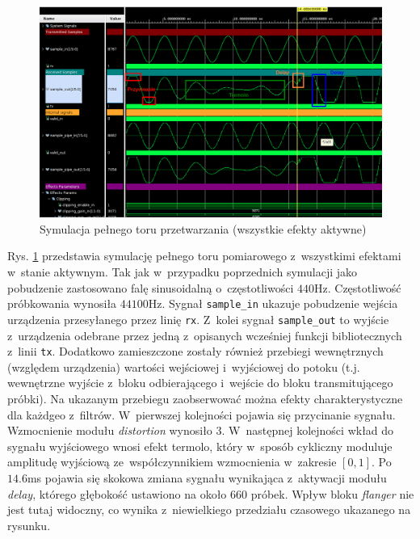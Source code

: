 \vspace{0.75cm}
\begin{figure}[ht]
    \centering
    \includegraphics[width=\textwidth]{img/sim/top_all_effects_sim.png}
    \captionsetup{format=plain,justification=centering}
    \caption{Symulacja pełnego toru przetwarzania (wszystkie efekty aktywne)}
    \label{top-all-sim}
\end{figure}
\vspace{0.75cm}

Rys. \ref{top-all-sim} przedstawia symulację pełnego toru pomiarowego z~wszystkimi efektami w~stanie aktywnym. Tak jak w~przypadku poprzednich symulacji jako pobudzenie zastosowano falę sinusoidalną o~częstotliwości $440$Hz. Częstotliwość próbkowania wynosiła $44100$Hz. Sygnał \verb|sample_in| ukazuje pobudzenie wejścia urządzenia przesyłanego przez linię \verb|rx|. Z~kolei sygnał \verb|sample_out| to wyjście z~urządzenia odebrane przez jedną z~opisanych wcześniej funkcji bibliotecznych z~linii \verb|tx|. Dodatkowo zamieszczone zostały również przebiegi wewnętrznych (względem urządzenia) wartości wejściowej i~wyjściowej do potoku (t.j. wewnętrzne wyjście z~bloku odbierającego i~wejście do bloku transmitującego próbki). Na ukazanym przebiegu zaobserwować można efekty charakterystyczne dla każdgeo z~filtrów. W~pierwszej kolejności pojawia się przycinanie sygnału. Wzmocnienie modułu \textit{distortion} wynosiło $3$. W~następnej kolejności wkład do sygnału wyjściowego wnosi efekt termolo, który w~sposób cykliczny moduluje amplitudę wyjściową ze~współczynnikiem wzmocnienia w~zakresie $[0,1]$. Po $14.6$ms pojawia się skokowa zmiana sygnału wynikająca z~aktywacji modułu \textit{delay}, którego głębokość ustawiono na około $660$ próbek. Wpływ bloku \textit{flanger} nie jest tutaj widoczny, co wynika z~niewielkiego przedziału czasowego ukazanego na rysunku.
